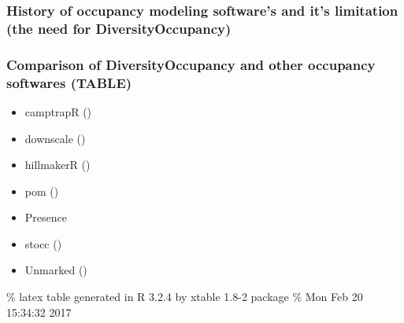 \documentclass[article]{jss}
\providecommand{\tightlist}{%
  \setlength{\itemsep}{0pt}\setlength{\parskip}{0pt}}
\begin{document}
\subsubsection{History of occupancy modeling software's and it's
limitation (the need for
DiversityOccupancy)}\label{history-of-occupancy-modeling-softwares-and-its-limitation-the-need-for-diversityoccupancy}

\subsubsection{Comparison of DiversityOccupancy and other occupancy
softwares
(TABLE)}\label{comparison-of-diversityoccupancy-and-other-occupancy-softwares-table}

\begin{itemize}
\tightlist
\item
  camptrapR ()
\item
  downscale ()
\item
  hillmakerR ()
\item
  pom ()
\item
  Presence
\item
  stocc ()
\item
  Unmarked ()
\end{itemize}

\% latex table generated in R 3.2.4 by xtable 1.8-2 package \% Mon Feb
20 15:34:32 2017

\begin{table}[ht]
\centering
{}
\end{table}
\end{document}
